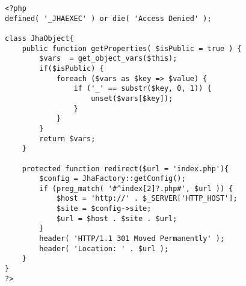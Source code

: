\begin{lstlisting}[label=jha_object,caption=Objeto Padre.]
<?php
defined( '_JHAEXEC' ) or die( 'Access Denied' );

class JhaObject{
    public function getProperties( $isPublic = true ) {
        $vars  = get_object_vars($this);
        if($isPublic) {
            foreach ($vars as $key => $value) {
                if ('_' == substr($key, 0, 1)) {
                    unset($vars[$key]);
                }
            }
        }
        return $vars;
    }
    
    protected function redirect($url = 'index.php'){
    	$config = JhaFactory::getConfig();
        if (preg_match( '#^index[2]?.php#', $url )) {
            $host = 'http://' . $_SERVER['HTTP_HOST'];
            $site = $config->site;
            $url = $host . $site . $url;
        }
        header( 'HTTP/1.1 301 Moved Permanently' );
        header( 'Location: ' . $url );
    }
}
?>
\end{lstlisting}
